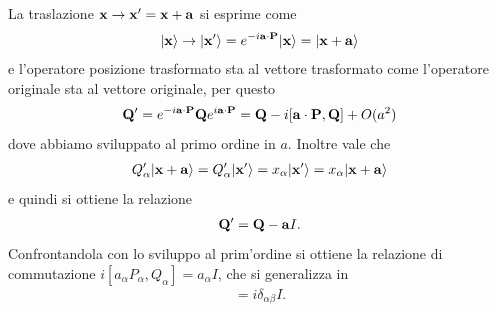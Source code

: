 La traslazione $ \mathbf{x} \to  \mathbf{x}' = \mathbf{x} + \mathbf{a} $ si esprime come 
\begin{align*}
  \vert \mathbf{x} \rangle \to \vert \mathbf{x}' \rangle = e^{-i \mathbf{a} \cdot \mathbf{P} } \vert \mathbf{x} \rangle = \vert \mathbf{x} + \mathbf{a} \rangle
\end{align*}
e l'operatore posizione trasformato sta al vettore trasformato come l'operatore originale sta al vettore originale, per questo 
\begin{align*}
  \mathbf{Q'} = e^{-i \mathbf{a \cdot P}} \mathbf{Q} e^{i \mathbf{a \cdot P}} = \mathbf{Q} - i [\mathbf{a \cdot P}, \mathbf{Q}] + O(a^2)
\end{align*}
dove abbiamo sviluppato al primo ordine in $ a $. Inoltre vale che 
\begin{align*}
  Q'_\alpha \vert \mathbf{x+a} \rangle = Q'_\alpha \vert \mathbf{x'} \rangle = x_\alpha \vert \mathbf{x'} \rangle = x_\alpha \vert \mathbf{x + a} \rangle
\end{align*}
e quindi si ottiene la relazione 
\begin{align*}
  \mathbf{Q'} = \mathbf{Q} - \mathbf{a}I.
\end{align*}
Confrontandola con lo sviluppo al prim'ordine si ottiene la relazione di commutazione $ i[a_\alpha P_\alpha, Q_\alpha] = a_\alpha I $, che si 
generalizza in 
\begin{align*}
  [Q_\alpha, P_\beta] = i\delta_{\alpha \beta} I.
\end{align*}

